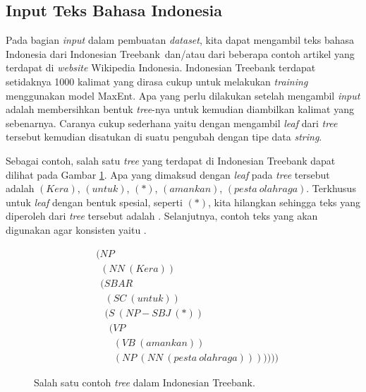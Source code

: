 \subsection{Input Teks Bahasa Indonesia}

Pada bagian \textit{input} dalam pembuatan \textit{dataset}, kita dapat mengambil teks bahasa Indonesia
dari Indonesian Treebank\footnotemark[1]\ dan/atau dari beberapa contoh artikel yang terdapat di
\textit{website} Wikipedia Indonesia\footnotemark[2].
Indonesian Treebank terdapat setidaknya 1000 kalimat yang dirasa cukup untuk melakukan
\textit{training} menggunakan model MaxEnt.
Apa yang perlu dilakukan setelah mengambil \textit{input} adalah membersihkan bentuk \textit{tree}-nya
untuk kemudian diambilkan kalimat yang sebenarnya.
Caranya cukup sederhana yaitu dengan mengambil \textit{leaf} dari \textit{tree} tersebut kemudian
disatukan di suatu pengubah dengan tipe data \textit{string}.

Sebagai contoh, salah satu \textit{tree} yang terdapat di Indonesian Treebank dapat dilihat pada
Gambar \ref{treebank:tree:1}.
Apa yang dimaksud dengan \textit{leaf} pada \textit{tree} tersebut adalah $(Kera)$, $(untuk)$,
$(*)$, $(amankan)$, $(pesta\ olahraga)$.
Terkhusus untuk \textit{leaf} dengan bentuk spesial, seperti $(*)$, kita hilangkan sehingga teks
yang diperoleh dari \textit{tree} tersebut adalah .
Selanjutnya, contoh teks yang akan digunakan agar konsisten yaitu
.


\begin{figure}\centering\small
	\begin{align*}
		&(NP\\
		&\ \ (NN\ (Kera))\\
		&\ \ (SBAR\\
		&\ \ \ \ (SC\ (untuk))\\
		&\ \ \ \ (S\ (NP-SBJ\ (*))\\
		&\ \ \ \ \ \ (VP\\
		&\ \ \ \ \ \ \ \ (VB\ (amankan))\\
		&\ \ \ \ \ \ \ \ (NP\ (NN\ (pesta\ olahraga)))))))
	\end{align*}
	\caption{Salah satu contoh \textit{tree} dalam Indonesian Treebank.}
	\label{treebank:tree:1}
\end{figure}


